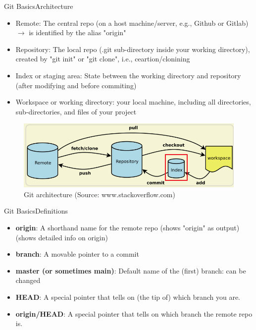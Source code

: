 \begin{frame}{Git Basics}{Architecture}
  \begin{itemize}
    \item Remote: The central repo (on a host machine/server, e.g., Github or Gitlab)
      {\color{red}$\rightarrow$ is identified by the alias "origin"}
    \item Repository: The local repo (.git sub-directory inside your working directory), created by "git init" or "git clone", i.e., ceartion/clonining
    \item Index or staging area: State between the working directory and repository (after modifying and before commiting)
    \item Workspace or working directory: your local machine, including all directories, sub-directories, and files of your project
  \end{itemize}
  \begin{figure}
    \begin{center}
    \includegraphics[width=0.8\linewidth]{pics/architecture.png}
    \vspace{-0.3cm}
    \caption{\footnotesize Git architecture (Source: www.stackoverflow.com)}
  \end{center}
\end{figure}

\end{frame}

\begin{frame}{Git Basics}{Definitions}
  \begin{itemize}
    \item \textbf{origin}: A shorthand name for the remote repo
       (shows "origin" as output)
       (shows detailed info on origin)
\item \textbf{branch}: A movable pointer to a commit
\item \textbf{master (or sometimes main)}: Default name of the (first) branch: can be changed
\item \textbf{HEAD}: A special pointer that tells on (the tip of) which branch you are.
\item \textbf{origin/HEAD}: A special pointer that tells on which branch the remote repo is.
\end{itemize}
\end{frame}


